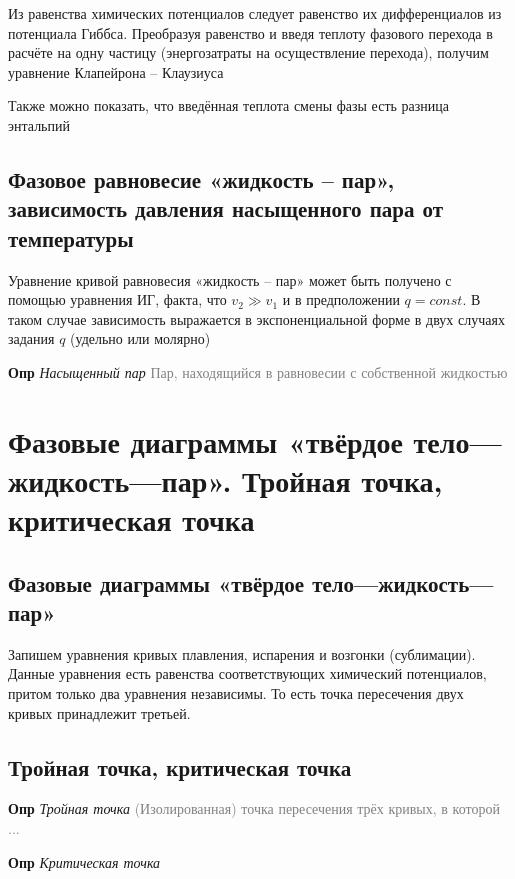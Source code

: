 \documentclass[a4paper, 14pt]{article}
\begin{document}
    Из равенства химических потенциалов следует равенство их дифференциалов из потенциала Гиббса.
    Преобразуя равенство и введя теплоту фазового перехода в расчёте на одну частицу (энергозатраты на осуществление
    перехода), получим уравнение Клапейрона -- Клаузиуса
    
    Также можно показать, что введённая теплота смены фазы есть разница энтальпий
    
    \subsection{Фазовое равновесие «жидкость -- пар», зависимость давления насыщенного пара от температуры}
    
    Уравнение кривой равновесия «жидкость -- пар» может быть получено с помощью уравнения ИГ, факта, что $v_2 \gg
    v_1$ и в предположении $q = const$.
    В таком случае зависимость выражается в экспоненциальной форме в двух случаях задания $q$ (удельно или молярно)
    
    \textbf{Опр} \textit{Насыщенный пар} \textcolor{gray}{Пар, находящийся в равновесии с собственной жидкостью}
    
    \section{Фазовые диаграммы «твёрдое тело—жидкость—пар».
    Тройная точка, критическая точка}
    
    \subsection{Фазовые диаграммы «твёрдое тело—жидкость—пар»}
    
    Запишем уравнения кривых плавления, испарения и возгонки (сублимации).
    Данные уравнения есть равенства соответствующих химический потенциалов, притом только два уравнения независимы.
    То есть точка пересечения двух кривых принадлежит третьей.
    
    \subsection{Тройная точка, критическая точка}
    
    \textbf{Опр} \textit{Тройная точка} \textcolor{gray}{(Изолированная) точка пересечения трёх кривых, в которой ...}
    
    \textbf{Опр} \textit{Критическая точка}
    
\end{document}
